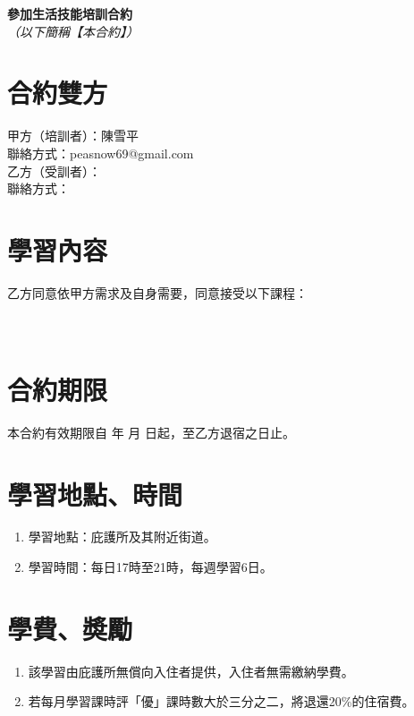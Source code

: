 \documentclass[12pt]{article}
\begin{document}
\allsectionsfont{\sffamily}
	\begin{center}
		\huge\textsf{\textbf{參加生活技能培訓合約}}\\
		\normalsize\textit{（以下簡稱【本合約】）}
	\end{center}
	\section{合約雙方}
	
		甲方（培訓者）：陳雪平\\
		聯絡方式：peasnow69@gmail.com\\
		
		乙方（受訓者）：\underline{\hspace{20em}}\\
		聯絡方式：\underline{\hspace{22.5em}}\\
	
	\section{學習內容}
		乙方同意依甲方需求及自身需要，同意接受以下課程：\\
		\underline{\hspace{15cm}}\\
		\underline{\hspace{15cm}}\\
	\section{合約期限}
		本合約有效期限自 \underline{\hspace{2cm}} 年 \underline{\hspace{1cm}} 月 \underline{\hspace{1cm}} 日起，至乙方退宿之日止。
	\section{學習地點、時間}
		\begin{enumerate}
			\item 學習地點：庇護所及其附近街道。
			\item 學習時間：每日17時至21時，每週學習6日。
		\end{enumerate}
	\section{學費、奬勵}
		\begin{enumerate}
			\item 該學習由庇護所無償向入住者提供，入住者無需繳納學費。
			\item 若每月學習課時評「優」課時數大於三分之二，將退還20\%的住宿費。
		\end{enumerate}
\end{document}
